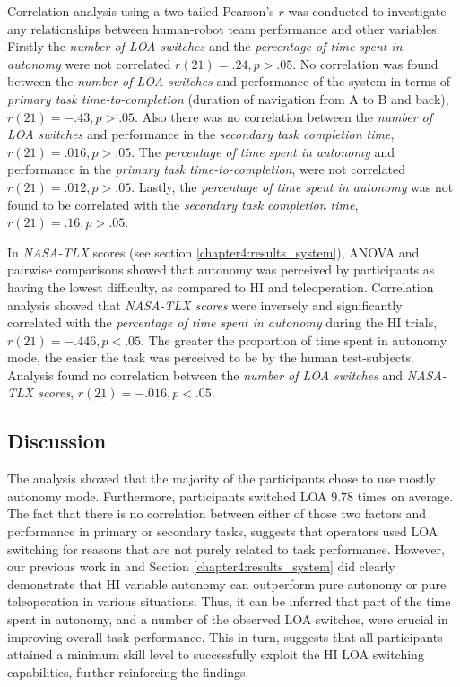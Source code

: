 \documentclass[a4paper,12pt,oneside,openright]{bhamthesis}
\begin{document}
Correlation analysis using a two-tailed Pearson's $r$ was conducted to investigate any relationships between human-robot team performance and other variables. Firstly the \textit{number of LOA switches} and the \textit{percentage of time spent in autonomy} were not correlated $r(21)= .24, p>.05 $. No correlation was found between the \textit{number of LOA switches} and performance of the system in terms of \textit{primary task time-to-completion} (duration of navigation from A to B and back), $r(21)= -.43, p>.05 $. Also there was no correlation between the \textit{number of LOA switches} and performance in the \textit{secondary task completion time}, $r(21)= .016, p>.05$. The \textit{percentage of time spent in autonomy} and performance in the \textit{primary task time-to-completion}, were not correlated $r(21)= .012, p > .05$. Lastly, the \textit{percentage of time spent in autonomy} was not found to be correlated with the \textit{secondary task completion time}, $r(21)= .16, p>.05$.

In \textit{NASA-TLX} scores (see section \ref{chapter4:results_system}), ANOVA and pairwise comparisons showed that autonomy was perceived by participants as having the lowest difficulty, as compared to HI and teleoperation. Correlation analysis showed that \textit{NASA-TLX scores} were inversely and significantly correlated with the \textit{percentage of time spent in autonomy} during the HI trials, $r(21)= -.446, p < .05$. The greater the proportion of time spent in autonomy mode, the easier the task was perceived to be by the human test-subjects. Analysis found no correlation between the \textit{number of LOA switches} and \textit{NASA-TLX scores}, $r(21)= -.016, p < .05$.

\subsection{Discussion}
The analysis showed that the majority of the participants chose to use mostly autonomy mode. Furthermore, participants switched LOA $9.78$ times on average. The fact that there is no correlation between either of those two factors and performance in primary or secondary tasks, suggests that operators used LOA switching for reasons that are not purely related to task performance. However, our previous work in \citep{Chiou2016} and Section \ref{chapter4:results_system} did clearly demonstrate that HI variable autonomy can outperform pure autonomy or pure teleoperation in various situations. Thus, it can be inferred that part of the time spent in autonomy, and a number of the observed LOA switches, were crucial in improving overall task performance. This in turn, suggests that all participants attained a minimum skill level to successfully exploit the HI LOA switching capabilities, further reinforcing the findings.
\end{document}
